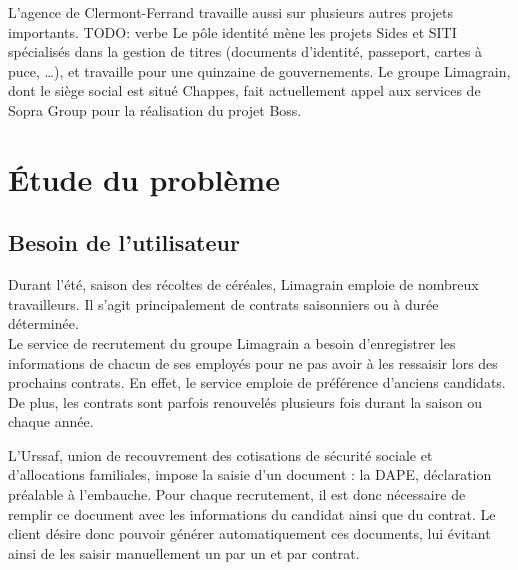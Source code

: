 L'agence de Clermont-Ferrand travaille aussi sur plusieurs autres projets importants.
TODO: verbe Le pôle identité mène les projets Sides et SITI spécialisés dans la gestion de titres (documents d'identité, passeport, cartes à puce, \ldots), et travaille pour une quinzaine de gouvernements.
Le groupe Limagrain, dont le siège social est situé Chappes, fait actuellement appel aux services de Sopra Group pour la réalisation du projet Boss.


\section{Étude du problème}


\subsection{Besoin de l'utilisateur}

Durant l'été, saison des récoltes de céréales, Limagrain emploie de nombreux travailleurs.
Il s'agit principalement de contrats saisonniers ou à durée déterminée.
\\

Le service de recrutement du groupe Limagrain a besoin d'enregistrer les informations de chacun de ses employés pour ne pas avoir à les ressaisir lors des prochains contrats.
En effet, le service emploie de préférence d'anciens candidats.
De plus, les contrats sont parfois renouvelés plusieurs fois durant la saison ou chaque année.

L'Urssaf, union de recouvrement des cotisations de sécurité sociale et d'allocations familiales, impose la saisie d'un document : la DAPE, déclaration préalable à l'embauche.
Pour chaque recrutement, il est donc nécessaire de remplir ce document avec les informations du candidat ainsi que du contrat.
Le client désire donc pouvoir générer automatiquement ces documents, lui évitant ainsi de les saisir manuellement un par un et par contrat.

